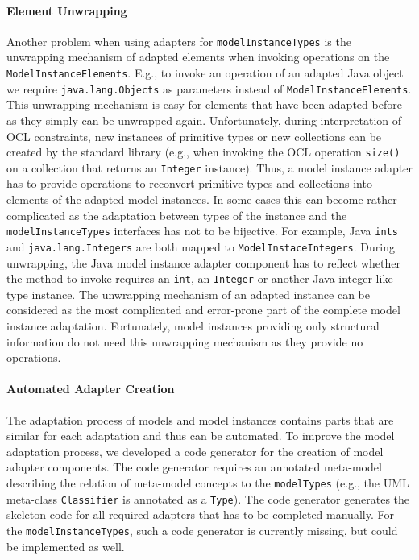 	\paragraph{Element Unwrapping}
	Another problem when using adapters for \texttt{model\-Instance\-Types} 
	is the unwrapping mechanism of adapted elements when invoking operations 
	on the \texttt{Model\-Instance\-Elements}. E.g., to invoke an operation of an adapted Java 
	object we require \texttt{java.lang.Objects} as parameters instead of 
	\texttt{Model\-Instance\-Elements}. This unwrapping mechanism is easy 
	for elements that have been adapted before as they simply can be unwrapped 
	again. Unfortunately, during interpretation of OCL constraints, 
	new instances of primitive types or new collections can be created 
	by the standard library (e.g., when invoking the OCL operation \texttt{size()} on a collection that 
	returns an \texttt{Integer} instance). Thus, a 
	model instance adapter has to provide operations to reconvert 
	pri\-mi\-tive types and collections into elements of the adapted model 
	instances. In some cases this can become rather complicated as 
	the adaptation between types of the instance and the \texttt{model\-Instance\-Types} interfaces has not to be bijective. For 
	example, Java \texttt{ints} and \texttt{java.lang.Integers} are 
	both mapped to \texttt{ModelInstaceIntegers}. During unwrapping, 
	the Java model instance adapter component has to reflect 
	whether the method to invoke requires an \texttt{int}, an 
	\texttt{Integer} or another Java integer-like type instance.
	The unwrapping mechanism of an adapted instance 
	can be considered as the most complicated and error-prone part 
	of the complete model instance adaptation.
	Fortunately, model instances providing only structural information do not
	need this unwrapping mechanism as they provide no operations.

	\paragraph{Automated Adapter Creation}
	The adaptation process of models and model 
	instances contains parts that are similar 
	for each adaptation and thus can be automated.
	To improve the model adaptation process, we developed a code ge\-ne\-ra\-tor 
	for the creation of model adapter components. The code 
	generator requires an annotated meta-model describing
	the relation of meta-model concepts to the \texttt{model\-Types} (e.g., the UML meta-class
	\texttt{Classifier} is annotated as a \texttt{Type}). 
	The code generator generates the skeleton code for all required 
	adapters that has to be completed manually.
	For the \texttt{model\-Instance\-Types}, such a code generator is currently 
	missing, but could be implemented as well.
	
